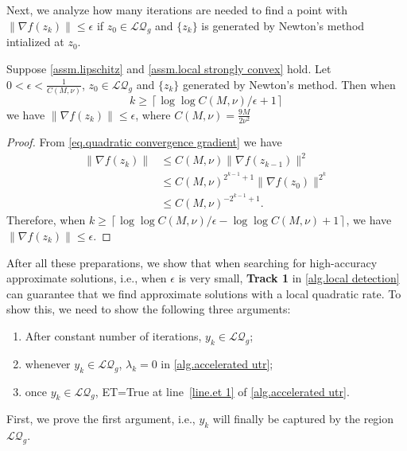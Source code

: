 \documentclass{article}
\begin{document}
Next, we analyze how many iterations are needed to find a point with $\|\nabla f(z_k)\|\leq \epsilon$ if $z_0 \in \mathcal{LQ}_g$ and $\{z_k\}$ is generated by Newton's method intialized at $z_0$.
\begin{corollary}
    \label{lem.number of iterations newton}
    Suppose \autoref{assm.lipschitz} and \autoref{assm.local strongly convex} hold. Let $0<\epsilon< \frac{1}{C(M,\nu)}$, $z_0\in\mathcal{LQ}_g$ and $\{z_k\}$ generated by Newton's method. Then when
    \begin{equation}
        \label{eq.number of iterations newton}
        k\geq \left\lceil\log\log C(M,\nu)/\epsilon+1\right\rceil
    \end{equation}
    we have $\|\nabla f(z_k)\|\leq \epsilon$, where $C(M,\nu) = \frac{9M}{2\nu^2}$
\end{corollary}
\begin{proof}
From \eqref{eq.quadratic convergence gradient} we have
    \begin{equation*}
        \begin{aligned}
            \|\nabla f(z_k)\|&\leq C(M,\nu)\|\nabla f(z_{k-1})\|^2\\
            &\leq C(M,\nu)^{2^{k-1}+1} \|\nabla f(z_0)\|^{2^k}\\
            &\leq C(M,\nu)^{-2^{k-1}+1}.
        \end{aligned}
    \end{equation*}
    Therefore, when $k\geq \left\lceil\log\log C(M,\nu)/\epsilon-\log\log C(M,\nu)+1\right\rceil$, we have $\|\nabla f(z_k)\|\leq \epsilon$.
\end{proof}
After all these preparations, we show that when searching for high-accuracy approximate solutions, i.e., when $\epsilon$ is very small, \textbf{Track 1} in \autoref{alg.local detection} can guarantee that we find approximate solutions with a local quadratic rate. To show this, we need to show the following three arguments:
\begin{enumerate}
    \item After constant number of iterations, $y_k\in\mathcal{LQ}_g$;
    \item whenever $y_k\in\mathcal{LQ}_g$, $\lambda_k=0$ in \autoref{alg.accelerated utr};
    \item once $y_k\in \mathcal{LQ}_g$, ET=True at line~\ref{line.et 1} of \autoref{alg.accelerated utr}.
\end{enumerate}
First, we prove the first argument, i.e., $y_k$ will finally be captured by the region $\mathcal{LQ}_g$.
\end{document}
